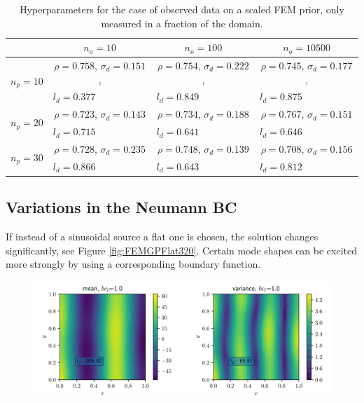 \documentclass[%
  a4paper,oneside,%
  11pt,%
  smallchapters,
  style=printdev,
  extramargin,
  green,%
  rgb, <cmyk>
  ]{tubsbook}
\begin{document}
\begin{table}[!ht]
\centering
\caption{Hyperparameters for the case of observed data on a scaled FEM prior, only measured in a fraction of the domain. }
\label{tab:75procHalf}
\begin{tabular}{@{}lccc@{}}
\toprule
                            & $n_o = 10$                      & $n_o = 100$                     & $n_o = 10500$                     \\ \midrule
\multirow{2}{*}{$n_p = 10$} & $\rho=0.758$, $\sigma_d=0.151$, & $\rho=0.754$, $\sigma_d=0.222$, & $\rho=0.745$, $\sigma_d=0.177$, \\
                            & \multicolumn{1}{l}{$l_d=0.377$} & \multicolumn{1}{l}{$l_d=0.849$} & \multicolumn{1}{l}{$l_d=0.875$} \\
\multirow{2}{*}{$n_p = 20$} & $\rho=0.723$, $\sigma_d=0.143$  & $\rho=0.734$, $\sigma_d=0.188$  & $\rho=0.767$, $\sigma_d=0.151$  \\
                            & \multicolumn{1}{l}{$l_d=0.715$} & \multicolumn{1}{l}{$l_d=0.641$} & \multicolumn{1}{l}{$l_d=0.646$} \\
\multirow{2}{*}{$n_p = 30$} & $\rho=0.728$, $\sigma_d=0.235$  & $\rho=0.748$, $\sigma_d=0.139$  & $\rho=0.708$, $\sigma_d=0.156$  \\
                            & \multicolumn{1}{l}{$l_d=0.866$} & \multicolumn{1}{l}{$l_d=0.643$} & \multicolumn{1}{l}{$l_d=0.812$} \\ \bottomrule
\end{tabular}
\end{table}


\FloatBarrier

\subsection{Variations in the Neumann BC}
If instead of a sinusoidal source a flat one is chosen, the solution changes significantly, see Figure \ref{fig:FEMGPFlat320}. Certain mode shapes can be excited more strongly by using a corresponding boundary function.
\begin{figure}[!ht]
\includegraphics[width=1\textwidth]{../../Python/Results/2D/VaryingSource/y_1/MeanVar.pdf}
\centering
\caption{}
\label{fig:varFieldPriorFlat1}
\end{figure}
%
\end{document}
